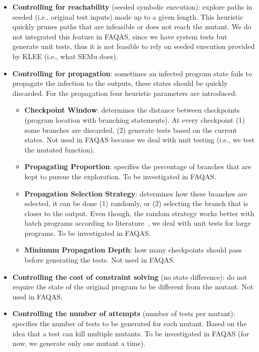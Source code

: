 \begin{itemize}
	\item \textbf{Controlling for reachability} (seeded symbolic execution): explore paths in seeded (i.e., original test inputs) mode up to a given length. This heuristic quickly prunes paths that are infeasible or does not reach the mutant. We do not integrated this feature in FAQAS, since we have system tests but generate unit tests, thus it is not feasible to rely on seeded execution provided by KLEE (i.e., what SEMu does).

	\item \textbf{Controlling for propagation}: sometimes an infected program state fails to propagate the infection to the outputs, these states should be quickly discarded. For the propagation four heuristic parameters are introduced:
	\begin{itemize}
		\item \textbf{Checkpoint Window}: determines the distance between checkpoints (program location with branching statements). At every checkpoint (1) some branches are discarded, (2) generate tests based on the current states. Not used in FAQAS because we deal with unit testing (i.e., we test the mutated function).
		\item \textbf{Propagating Proportion}: specifies the percentage of branches that are kept to pursue the exploration. To be investigated in FAQAS.
		\item \textbf{Propagation Selection Strategy}: determines how these branches are selected, it can be done (1) randomly, or (2) selecting the branch that is closer to the output. Even though, the random strategy works better with batch programs according to literature~\cite{chekam2021killing}, we deal with unit tests for large programs. To be investigated in FAQAS. 
	\item \textbf{Minimum Propagation Depth}: how many checkpoints should pass before generating the tests. Not used in FAQAS.
	\end{itemize}


	\item \textbf{Controlling the cost of constraint solving} (no state difference): do not require the state of the original program to be different from the mutant. Not used in FAQAS.

	\item \textbf{Controlling the number of attempts} (number of tests per mutant): specifies the number of tests to be generated for each mutant. Based on the idea that a test can kill multiple mutants. To be investigated in FAQAS (for now, we generate only one mutant a time).

\end{itemize}



